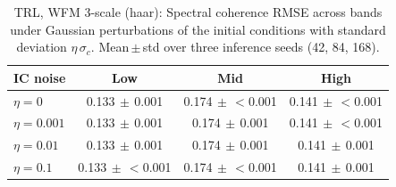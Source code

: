 \begin{table}[ht]
\centering
\caption{TRL, WFM 3-scale (haar): Spectral coherence RMSE across bands under Gaussian perturbations of the initial conditions with standard deviation $\eta\,\sigma_c$. Mean\,$\pm$\,std over three inference seeds (42, 84, 168).}
\label{tab:ic_pert_spectral}
\begin{tabular}{lccc}
\toprule
IC noise & Low & Mid & High \\
\midrule
$\eta=0$ & 0.133{\scriptsize$\,\pm\,$0.001} & 0.174{\scriptsize$\,\pm\,$$<$0.001} & 0.141{\scriptsize$\,\pm\,$$<$0.001} \\
$\eta=0.001$ & 0.133{\scriptsize$\,\pm\,$0.001} & 0.174{\scriptsize$\,\pm\,$0.001} & 0.141{\scriptsize$\,\pm\,$$<$0.001} \\
$\eta=0.01$ & 0.133{\scriptsize$\,\pm\,$0.001} & 0.174{\scriptsize$\,\pm\,$0.001} & 0.141{\scriptsize$\,\pm\,$0.001} \\
$\eta=0.1$ & 0.133{\scriptsize$\,\pm\,$$<$0.001} & 0.174{\scriptsize$\,\pm\,$$<$0.001} & 0.141{\scriptsize$\,\pm\,$0.001} \\
\bottomrule
\end{tabular}
\end{table}
